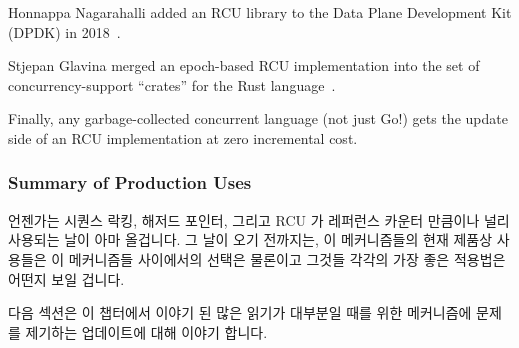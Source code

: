 Honnappa Nagarahalli added an RCU library to the Data Plane Development
Kit (DPDK) in 2018~\cite{HonnappaNagarahalli2018dpdkRCU}.

Stjepan Glavina merged an epoch-based RCU implementation into the
 set of concurrency-support ``crates'' for the Rust
language~\cite{StjepanGlavina2018RustRCU}.

Finally, any garbage-collected concurrent language (not just Go!) gets
the update side of an RCU implementation at zero incremental cost.

\fi

\subsubsection{Summary of Production Uses}
\label{sec:defer:Summary of Production Uses}

언젠가는 시퀀스 락킹, 해저드 포인터, 그리고 RCU 가 레퍼런스 카운터 만큼이나
널리 사용되는 날이 아마 올겁니다.
그 날이 오기 전까지는, 이 메커니즘들의 현재 제품상 사용들은 이 메커니즘들
사이에서의 선택은 물론이고 그것들 각각의 가장 좋은 적용법은 어떤지 보일 겁니다.

다음 섹션은 이 챕터에서 이야기 된 많은 읽기가 대부분일 때를 위한 메커니즘에
문제를 제기하는 업데이트에 대해 이야기 합니다.

\iffalse

Perhaps the time will come when sequence locking, hazard pointers, and
RCU are all as heavily used and as well known as are reference counters.
Until that time comes, the current production uses of these mechanisms
should help guide the choice of mechanism as well as showing how best
to apply each of them.

The next section discusses updates, a ticklish issue for many of the
read-mostly mechanisms described in this chapter.

\fi
